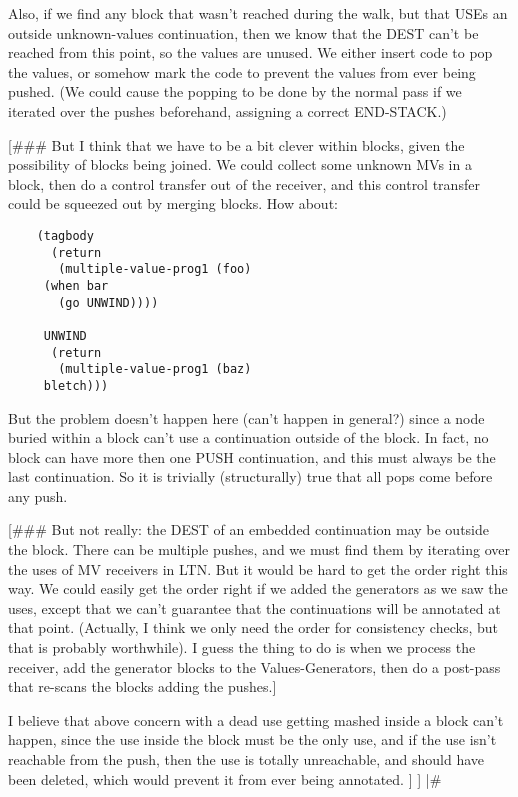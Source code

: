 Also, if we find any block that wasn't reached during the walk, but that USEs
an outside unknown-values continuation, then we know that the DEST can't be
reached from this point, so the values are unused.  We either insert code to
pop the values, or somehow mark the code to prevent the values from ever being
pushed.  (We could cause the popping to be done by the normal pass if we
iterated over the pushes beforehand, assigning a correct END-STACK.)

[\#\#\# But I think that we have to be a bit clever within blocks, given the
possibility of blocks being joined.  We could collect some unknown MVs in a
block, then do a control transfer out of the receiver, and this control
transfer could be squeezed out by merging blocks.  How about:

\begin{verbatim}
    (tagbody
      (return
       (multiple-value-prog1 (foo)
	 (when bar
	   (go UNWIND))))

     UNWIND
      (return
       (multiple-value-prog1 (baz)
	 bletch)))
\end{verbatim}

But the problem doesn't happen here (can't happen in general?) since a node
buried within a block can't use a continuation outside of the block.  In fact,
no block can have more then one PUSH continuation, and this must always be the
last continuation.  So it is trivially (structurally) true that all pops come
before any push.

[\#\#\# But not really: the DEST of an embedded continuation may be outside the
block.  There can be multiple pushes, and we must find them by iterating over
the uses of MV receivers in LTN.  But it would be hard to get the order right
this way.  We could easily get the order right if we added the generators as we
saw the uses, except that we can't guarantee that the continuations will be
annotated at that point.  (Actually, I think we only need the order for
consistency checks, but that is probably worthwhile).  I guess the thing to do
is when we process the receiver, add the generator blocks to the
Values-Generators, then do a post-pass that re-scans the blocks adding the
pushes.]

I believe that above concern with a dead use getting mashed inside a block
can't happen, since the use inside the block must be the only use, and if the
use isn't reachable from the push, then the use is totally unreachable, and
should have been deleted, which would prevent it from ever being
annotated.
]
]
|\#

